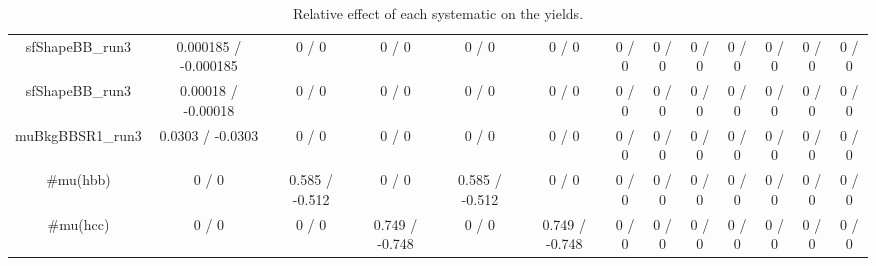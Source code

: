 \documentclass[10pt]{article}
\begin{document}
\begin{table}[htbp]
\begin{center}
\begin{tabular}{|c|c|c|c|c|c|c|c|c|c|c|c|c|}
  sfShapeBB_run3 & 0.000185 / -0.000185 & 0 / 0 & 0 / 0 & 0 / 0 & 0 / 0 & 0 / 0 & 0 / 0 & 0 / 0 & 0 / 0 & 0 / 0 & 0 / 0 & 0 / 0 \\ 
  sfShapeBB_run3 & 0.00018 / -0.00018 & 0 / 0 & 0 / 0 & 0 / 0 & 0 / 0 & 0 / 0 & 0 / 0 & 0 / 0 & 0 / 0 & 0 / 0 & 0 / 0 & 0 / 0 \\ 
  muBkgBBSR1_run3 & 0.0303 / -0.0303 & 0 / 0 & 0 / 0 & 0 / 0 & 0 / 0 & 0 / 0 & 0 / 0 & 0 / 0 & 0 / 0 & 0 / 0 & 0 / 0 & 0 / 0 \\ 
  #mu(hbb) & 0 / 0 & 0.585 / -0.512 & 0 / 0 & 0.585 / -0.512 & 0 / 0 & 0 / 0 & 0 / 0 & 0 / 0 & 0 / 0 & 0 / 0 & 0 / 0 & 0 / 0 \\ 
  #mu(hcc) & 0 / 0 & 0 / 0 & 0.749 / -0.748 & 0 / 0 & 0.749 / -0.748 & 0 / 0 & 0 / 0 & 0 / 0 & 0 / 0 & 0 / 0 & 0 / 0 & 0 / 0 \\ 
\hline 
\end{tabular} 
\caption{Relative effect of each systematic on the yields.} 
\end{center} 
\end{table} 
\end{document}

